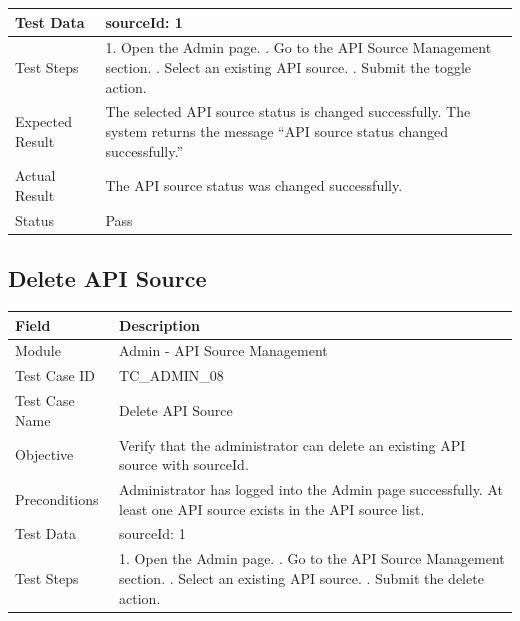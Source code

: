 \documentclass[12pt,a4paper]{article}
\begin{document}
{{\begin{longtable}{|p{4cm}|p{10cm}|}
	Test Data &
	sourceId: 1
	\\ \hline
	
	Test Steps &
	1. Open the Admin page. \newline
	2. Go to the API Source Management section. \newline
	3. Select an existing API source. \newline
	4. Submit the toggle action.
	\\ \hline
	
	Expected Result &
	The selected API source status is changed successfully. The system returns the message ``API source status changed successfully.'' \\ \hline
	
	Actual Result &
	The API source status was changed successfully. \\ \hline
	
	Status & Pass \\ \hline
	
\end{longtable}
\subsection{Delete API Source}
\begin{longtable}{|p{4cm}|p{10cm}|}
	\hline
	\textbf{Field} & \textbf{Description} \\ \hline
	
	Module & Admin - API Source Management \\ \hline
	
	Test Case ID & TC\_ADMIN\_08 \\ \hline
	
	Test Case Name & Delete API Source \\ \hline
	
	Objective &
	Verify that the administrator can delete an existing API source with sourceId. \\ \hline
	
	Preconditions &
	Administrator has logged into the Admin page successfully. \newline
	At least one API source exists in the API source list.
	\\ \hline
	
	Test Data &
	sourceId: 1
	\\ \hline
	
	Test Steps &
	1. Open the Admin page. \newline
	2. Go to the API Source Management section. \newline
	3. Select an existing API source. \newline
	4. Submit the delete action.
	\\ \hline
	

\end{longtable}}}
\end{document}
